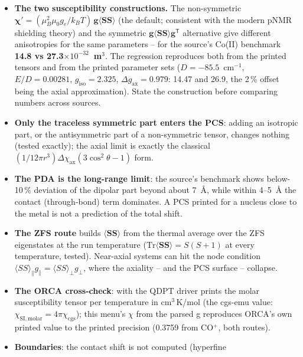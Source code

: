 \begin{readbox}
\begin{itemize}
  \item \textbf{The two susceptibility constructions.}  The non-symmetric
    $\boldsymbol{\chi}' = (\mu_B^2\mu_0 g_e/k_BT)\,\mathbf{g}\langle
    \mathbf{SS}\rangle$ (the default; consistent with the modern pNMR
    shielding theory) and the symmetric
    $\mathbf{g}\langle\mathbf{SS}\rangle\mathbf{g}^{\mathsf T}$ alternative
    give different anisotropies for the same parameters -- for the source's
    Co(II) benchmark \textbf{14.8 vs 27.3$\times10^{-32}$~m$^3$}.  The
    regression reproduces both from the printed tensors and from the printed
    parameter sets ($D=-85.5$~cm$^{-1}$, $E/D=0.00281$, $g_{\mathrm{iso}}=
    2.325$, $\Delta g_{\mathrm{ax}}=0.979$: 14.47 and 26.9, the 2\,\% offset
    being the axial approximation).  State the construction before comparing
    numbers across sources.
  \item \textbf{Only the traceless symmetric part enters the PCS}: adding an
    isotropic part, or the antisymmetric part of a non-symmetric tensor,
    changes nothing (tested exactly); the axial limit is exactly the
    classical $(1/12\pi r^3)\Delta\chi_{\mathrm{ax}}(3\cos^2\theta-1)$ form.
  \item \textbf{The PDA is the long-range limit}: the source's benchmark
    shows below-10\,\% deviation of the dipolar part beyond about 7~\AA,
    while within 4--5~\AA{} the contact (through-bond) term dominates.
    A PCS printed for a nucleus close to the metal is not a prediction of
    the total shift.
  \item \textbf{The ZFS route} builds $\langle\mathbf{SS}\rangle$ from the
    thermal average over the ZFS eigenstates at the run temperature
    ($\mathrm{Tr}\langle\mathbf{SS}\rangle = S(S+1)$ at every temperature,
    tested).  Near-axial systems can hit the node condition
    $\langle SS\rangle_\parallel g_\parallel =
    \langle SS\rangle_\perp g_\perp$, where the axiality -- and the PCS
    surface -- collapse.
  \item \textbf{The ORCA cross-check}: with  the QDPT
    driver prints the molar susceptibility tensor per temperature in
    cm$^3$\,K/mol (the cgs-emu value: $\chi_{\mathrm{SI,molar}} = 4\pi
    \chi_{\mathrm{cgs}}$); this menu's $\chi$ from the parsed g reproduces
    ORCA's own printed value to the printed precision (0.3759 from CO$^+$,
    both routes).
  \item \textbf{Boundaries}: the contact shift is not computed (hyperfine

\end{itemize}
\end{readbox}
